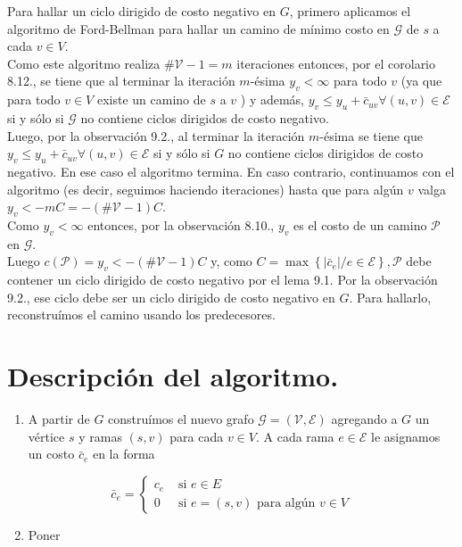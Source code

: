 \documentclass[10pt]{article}
\begin{document}
Para hallar un ciclo dirigido de costo negativo en $G$, primero aplicamos el algoritmo de Ford-Bellman para hallar un camino de mínimo costo en $\mathcal{G}$ de $s$ a cada $v \in V$.\\
Como este algoritmo realiza $\# \mathcal{V}-1=m$ iteraciones entonces, por el corolario 8.12., se tiene que al terminar la iteración $m$-ésima $y_{v}<\infty$ para todo $v$ (ya que para todo $v \in V$ existe un camino de $s$ a $v$ ) y además, $y_{v} \leq y_{u}+\bar{c}_{u v} \forall(u, v) \in \mathcal{E}$ si y sólo si $\mathcal{G}$ no contiene ciclos dirigidos de costo negativo.\\
Luego, por la observación 9.2., al terminar la iteración $m$-ésima se tiene que $y_{v} \leq y_{u}+\bar{c}_{u v} \forall(u, v) \in \mathcal{E}$ si y sólo si $G$ no contiene ciclos dirigidos de costo negativo. En ese caso el algoritmo termina. En caso contrario, continuamos con el algoritmo (es decir, seguimos haciendo iteraciones) hasta que para algún $v$ valga $y_{v}<-m C=-(\# \mathcal{V}-1) C$.\\
Como $y_{v}<\infty$ entonces, por la observación 8.10., $y_{v}$ es el costo de un camino $\mathcal{P}$ en $\mathcal{G}$.\\
Luego $c(\mathcal{P})=y_{v}<-(\# \mathcal{V}-1) C$ y, como $C=\max \left\{\left|\bar{c}_{e}\right| / e \in \mathcal{E}\right\}, \mathcal{P}$ debe contener un ciclo dirigido de costo negativo por el lema 9.1. Por la observación 9.2., ese ciclo debe ser un ciclo dirigido de costo negativo en $G$. Para hallarlo, reconstruímos el camino usando los predecesores.

\section*{Descripción del algoritmo.}
\begin{enumerate}
  \item A partir de $G$ construímos el nuevo grafo $\mathcal{G}=(\mathcal{V}, \mathcal{E})$ agregando a $G$ un vértice $s$ y ramas $(s, v)$ para cada $v \in V$. A cada rama $e \in \mathcal{E}$ le asignamos un costo $\bar{c}_{e}$ en la forma
\end{enumerate}

$$
\bar{c}_{e}= \begin{cases}c_{e} & \text { si } e \in E \\ 0 & \text { si } e=(s, v) \text { para algún } v \in V\end{cases}
$$

\begin{enumerate}
  \setcounter{enumi}{1}
  \item Poner
\end{enumerate}
\end{document}
